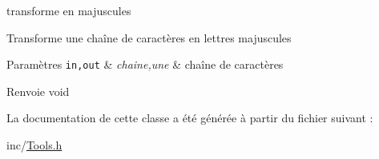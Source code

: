 transforme en majuscules 

Transforme une chaîne de caractères en lettres majuscules


\begin{DoxyParams}[1]{Paramètres}
\mbox{\tt in,out}  & {\em chaine,une} & chaîne de caractères \\
\hline
\end{DoxyParams}
\begin{DoxyReturn}{Renvoie}
void 
\end{DoxyReturn}


La documentation de cette classe a été générée à partir du fichier suivant :\begin{DoxyCompactItemize}
\item 
inc/\hyperlink{_tools_8h}{Tools.h}\end{DoxyCompactItemize}
